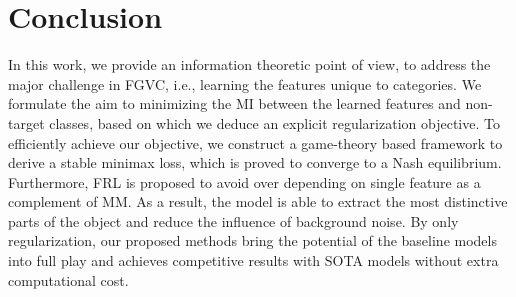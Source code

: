 \documentclass{article}
\theoremstyle{definition}
\begin{document}
\section{Conclusion}
In this work, we provide an information theoretic point of view, to address the major challenge in FGVC, i.e., learning the features unique to categories. We formulate the aim to minimizing the MI between the learned features and non-target classes, based on which we deduce an explicit regularization objective. To efficiently achieve our objective, we construct a game-theory based framework to derive a stable minimax loss, which is proved to converge to a Nash equilibrium. Furthermore, FRL is proposed to avoid over depending on single feature as a complement of MM. As a result, the model is able to extract the most distinctive parts of the object and reduce the influence of background noise. By only regularization, our proposed methods bring the potential of the baseline models into full play and achieves competitive results with SOTA models without extra computational cost.


\end{document}
